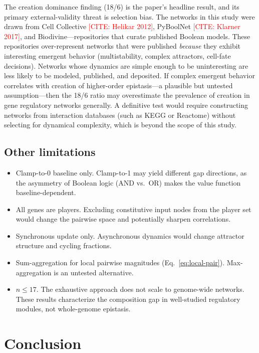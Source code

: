 \documentclass[11pt]{article}
\newcommand{\citeneeded}[1]{\textcolor{red}{[CITE: #1]}}
\begin{document}
The creation dominance finding (18/6) is the paper's headline result,
and its primary external-validity threat is selection bias.
The networks in this study were drawn from Cell Collective
\citeneeded{Helikar 2012}, PyBoolNet \citeneeded{Klarner 2017}, and
Biodivine---repositories that curate published Boolean models. These
repositories over-represent networks that were published \emph{because}
they exhibit interesting emergent behavior (multistability, complex
attractors, cell-fate decisions). Networks whose dynamics are simple
enough to be uninteresting are less likely to be modeled, published,
and deposited. If complex emergent behavior correlates with creation
of higher-order epistasis---a plausible but untested assumption---then
the 18/6 ratio may overestimate the prevalence of creation in gene
regulatory networks generally. A definitive test would require
constructing networks from interaction databases (such as KEGG or
Reactome) without selecting for dynamical complexity, which is beyond
the scope of this study.

\subsection{Other limitations}

\begin{itemize}
\item Clamp-to-0 baseline only. Clamp-to-1 may yield different gap
  directions, as the asymmetry of Boolean logic (AND vs.\ OR) makes
  the value function baseline-dependent.
\item All genes are players. Excluding constitutive input nodes
  from the player set would change the pairwise space and potentially
  sharpen correlations.
\item Synchronous update only. Asynchronous dynamics would change
  attractor structure and cycling fractions.
\item Sum-aggregation for local pairwise magnitudes
  (Eq.~\ref{eq:local-pair}). Max-aggregation is an untested
  alternative.
\item $n \leq 17$. The exhaustive approach does not scale to
  genome-wide networks. These results characterize the composition
  gap in well-studied regulatory modules, not whole-genome epistasis.
\end{itemize}


\section{Conclusion}
\label{sec:conclusion}
\end{document}
